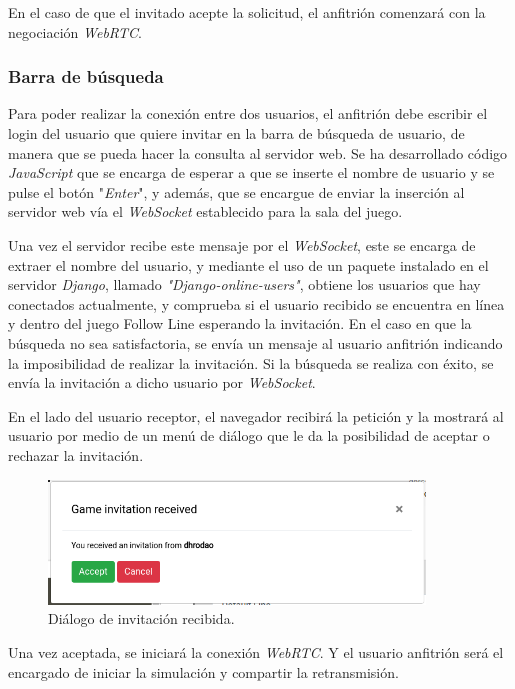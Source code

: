 \documentclass[a4paper, 12pt]{book}
\begin{document}
En el caso de que el invitado acepte la solicitud, el anfitrión comenzará con la negociación \emph{WebRTC}. 

\subsubsection{Barra de búsqueda}

Para poder realizar la conexión entre dos usuarios, el anfitrión debe escribir el login del usuario que quiere invitar en la barra de búsqueda de usuario, de manera que se pueda hacer la consulta al servidor web. Se ha desarrollado código \emph{JavaScript} que se encarga de esperar a que se inserte el nombre de usuario y se pulse el botón "\emph{Enter}", y además, que se encargue de enviar la inserción al servidor web vía el \emph{WebSocket} establecido para la sala del juego.

Una vez el servidor recibe este mensaje por el \emph{WebSocket}, este se encarga de extraer el nombre del usuario, y mediante el uso de un paquete instalado en el servidor \emph{Django}, llamado \emph{"Django-online-users"}, obtiene los usuarios que hay conectados actualmente, y comprueba si el usuario recibido se encuentra en línea y dentro del juego Follow Line esperando la invitación. En el caso en que la búsqueda no sea satisfactoria, se envía un mensaje al usuario anfitrión indicando la imposibilidad de realizar la invitación. Si la búsqueda se realiza con éxito, se envía la invitación a dicho usuario por \emph{WebSocket}.

En el lado del usuario receptor, el navegador recibirá la petición y la mostrará al usuario por medio de un menú de diálogo que le da la posibilidad de aceptar o rechazar la invitación.
\begin{figure}[H]
	\centering
    \includegraphics[width=10cm]{img/invitation.png}
    \caption{Diálogo de invitación recibida.}
    \label{figura:diagrama_conexion_webrtc}
\end{figure}


Una vez aceptada, se iniciará la conexión \emph{WebRTC}. Y el usuario anfitrión será el encargado de iniciar la simulación y compartir la retransmisión.
\end{document}
